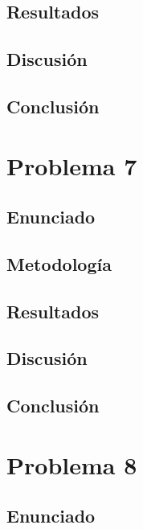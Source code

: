 \documentclass{article}
\begin{document}
\subsection{Resultados}
\setcounter{equation}{0}

\subsection{Discusión}

\subsection{Conclusión}

\section{Problema 7}

\subsection{Enunciado}

\subsection{Metodología}

\subsection{Resultados}
\setcounter{equation}{0}

\subsection{Discusión}

\subsection{Conclusión}

\section{Problema 8}

\subsection{Enunciado}
\end{document}
